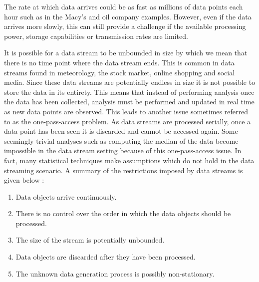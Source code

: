 

The rate at which data arrives could be as fast as millions of data points each hour such as in the Macy's and oil company examples. However, even if the data arrives more slowly, this can still provide a challenge if the available processing power, storage capabilities or transmission rates are limited.



 It is possible for a data stream to be unbounded in size by which we mean that there is no time point where the data stream ends.  This is common in data streams found in meteorology, the stock market, online shopping and social media. Since these data streams are potentially endless in size it is not possible to store the data in its entirety. This means that instead of performing analysis once the data has been collected, analysis must be performed and updated in real time as new data points are observed. This leads to another issue sometimes referred to as the one-pass-access problem. As data streams are processed serially, once a data point has been seen it is discarded and cannot be accessed again. Some seemingly trivial analyses such as computing the median of the data become impossible in the data stream setting because of this one-pass-access issue.  In fact, many statistical techniques make assumptions which do not hold in the data streaming scenario. A summary of the restrictions imposed by data streams is given below \citep{Silva2013}:

\begin{enumerate}
\item Data objects arrive continuously.
\item There is no control over the order in which the data objects should be processed.
\item The size of the stream is potentially unbounded.
\item Data objects are discarded after they have been processed.
\item The unknown data generation process is possibly non-stationary.
\end{enumerate}

